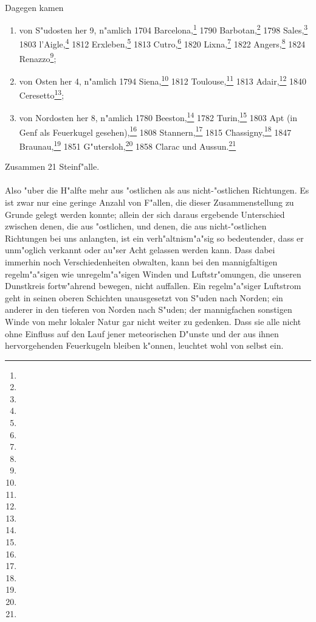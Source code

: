 \documentclass[a4paper, 8pt, oneside, polutonikogreek, german]{article}
\begin{document}
\paragraph{}
Dagegen kamen
\begin{enumerate}
    \item[4.] von S"udosten her 9, n"amlich 1704 Barcelona,\footnote{} 1790 Barbotan,\footnote{} 1798 Sales,\footnote{} 1803 l'Aigle,\footnote{} 1812 Erxleben,\footnote{} 1813 Cutro,\footnote{} 1820 Lixna,\footnote{} 1822 Angers,\footnote{} 1824 Renazzo\footnote{};

    \item[5.] von Osten her 4, n"amlich 1794 Siena,\footnote{} 1812 Toulouse,\footnote{} 1813 Adair,\footnote{} 1840 Ceresetto\footnote{};

    \item[6.] von Nordosten her 8, n"amlich 1780 Beeston,\footnote{} 1782 Turin,\footnote{} 1803 Apt (in Genf als Feuerkugel gesehen),\footnote{} 1808 Stannern,\footnote{} 1815 Chassigny,\footnote{} 1847 Braunau,\footnote{} 1851 G"utersloh,\footnote{} 1858 Clarac und Aussun.\footnote{}
\end{enumerate}
\begin{center}
Zusammen 21 Steinf"alle.
\end{center}
\paragraph{}
Also "uber die H"alfte mehr aus "ostlichen als aus nicht-"ostlichen Richtungen. Es ist zwar nur eine geringe Anzahl von F"allen, die dieser Zusammenstellung zu Grunde gelegt werden konnte; allein der sich daraus ergebende Unterschied zwischen denen, die aus "ostlichen, und denen, die aus nicht-"ostlichen Richtungen bei uns anlangten, ist ein verh"altnism"a"sig so bedeutender, dass er unm"oglich verkannt oder au"ser Acht gelassen werden kann. Dass dabei immerhin noch Verschiedenheiten obwalten, kann bei den mannigfaltigen regelm"a"sigen wie unregelm"a"sigen Winden und Luftstr"omungen, die unseren Dunstkreis fortw"ahrend bewegen, nicht auffallen. Ein regelm"a"siger Luftstrom geht in seinen oberen Schichten unausgesetzt von S"uden nach Norden; ein anderer in den tieferen von Norden nach S"uden; der mannigfachen sonstigen Winde von mehr lokaler Natur gar nicht weiter zu gedenken. Dass sie alle nicht ohne Einfluss auf den Lauf jener meteorischen D"unste und der aus ihnen hervorgehenden Feuerkugeln bleiben k"onnen, leuchtet wohl von selbst ein.
\end{document}
